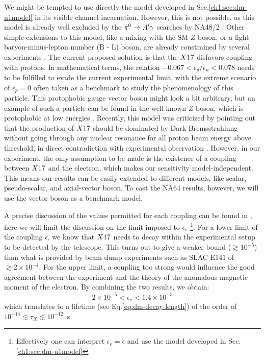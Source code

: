 We might be tempted to use directly the model developed in Sec.\ref{ch1:sec:dm-u1model} in its visible channel incarnation. However, this is not possible, as this model is already well excluded by the $\pi^0 \to A' \gamma$ searches by NA48/2 \cite{na48}. Other simple extensions to this model, like a mixing with the SM $Z$ boson, or a light baryon-minus-lepton number (B - L) boson, are already constrained by several experiments \cite{PhysRevD.95.035017}. The current proposed solution is that the $X17$ disfavors coupling with protons. In mathematical terms, the relation $-0.067 < \epsilon_p/\epsilon_n < 0.078$ needs to be fulfilled to evade the current experimental limit, with the extreme scenario of $\epsilon_p = 0$ often taken as a benchmark to study the phenomenology of this particle. This protophobic gauge vector boson might look a bit arbitrary, but an example of such a particle can be found in the well-known $Z$ boson, which is protophobic at low energies \cite{PhysRevD.95.035017}. Recently, this model was criticized by pointing out that the production of $X17$ should be dominated by Dark Bremsstrahlung without going through any nuclear resonance for all proton beam energy above threshold, in direct contradiction with experimental observation \cite{zhang2020protophobic}.  However, in our experiment, the only assumption to be made is the existence of a coupling between $X17$ and the electron, which makes our sensitivity model-independent. This means our results can be easily extended to different models, like scalar, pseudo-scalar, and axial-vector boson. To cast the NA64 results, however, we will use the vector boson as a benchmark model.

A precise discussion of the values permitted for each coupling can be found in \cite{Feng:2016jff,PhysRevD.95.035017}, here we will limit the discussion on the limit imposed to $\epsilon_e$ \footnote{Effectively one can interpret $\epsilon_e = \epsilon$ and use the model developed in Sec.\ref{ch1:sec:dm-u1model}}. For a lower limit of the coupling $\epsilon$, we know that $X17$ needs to decay within the experimental setup to be detected by the telescope. This turns out to give a weaker bound ($\gtrsim 10^{-5}$) than what is provided by beam dump experiments such as SLAC E141 \cite{blum} of $\gtrsim 2 \times 10^{-4}$. For the upper limit, a coupling too strong would influence the good agreement between the experiment and the theory of the anomalous magnetic moment of the electron. By combining the two results, we obtain:
\begin{equation}
  \label{eq:x17-limits}
  2 \times 10^{-5} < \epsilon_e < 1.4 \times 10^{-3}
\end{equation}
which translates to a lifetime (see Eq.\ref{eq:dm-decay-length}) of the order of $10^{-14}\lesssim \tau_X \lesssim 10^{-12}$~s.

